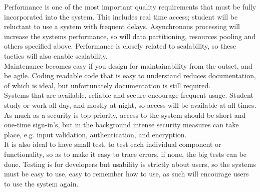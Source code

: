 
%

Performance is one of the most important quality requirements that must be fully incorporated into the system.  This includes real time access; student will be reluctant to use a system with frequent delays. Asynchronous processing will increase the systems performance, so will data partitioning, resources pooling and others specified above.  Performance is closely related to scalability, so these tactics will also enable scalability.\\
	
Maintenance becomes easy if you design for maintainability from the outset, and be agile.
Coding readable code that is easy to understand reduces documentation, of which is ideal, but unfortunately documentation is still required.\\
 	
Systems that are available, reliable and secure encourage frequent usage.
Student study or work all day, and mostly at night, so access will be available at all times. As much as a security is top priority, access to the system should be short and one-time sign-in’s, but in the background intense security measures can take place, e.g. input validation, authentication, and encryption.\\

It is also ideal to have small test, to test each individual component or functionality, so as to make it easy to trace errors, if none, the big tests can be done. Testing is for developers but usability is strictly about users, so the systems must be easy to use, easy to remember how to use, as such will encourage users to use the system again.\\

%